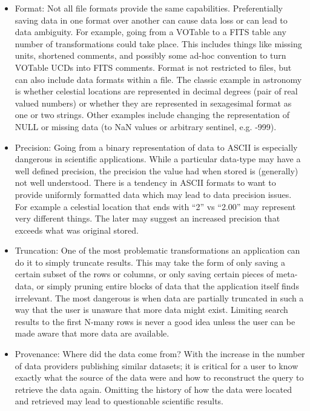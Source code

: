 \begin{itemize}

\item Format:  Not all file formats provide the same capabilities. Preferentially saving data in one format over another can cause data loss or can lead to data ambiguity.  For example, going from a VOTable to a FITS table any number of transformations could take place. This includes things like missing units, shortened comments, and possibly some ad-hoc convention to turn VOTable UCDs into FITS comments. Format is not restricted to files, but can also include data formats within a file.  The classic example in astronomy is whether celestial locations are represented in decimal degrees (pair of real valued numbers) or  whether they are represented in sexagesimal format as one or two strings. Other examples include changing the representation of NULL or missing data (to NaN values or arbitrary sentinel, e.g. -999).


\item Precision:  Going from a binary representation of data to ASCII is especially dangerous in scientific applications.   While a particular data-type may have a well defined precision, the precision the value had when stored is (generally) not well understood. There is a tendency in ASCII formats to want to provide uniformly formatted data which may lead to data precision issues.  For example a celestial location that ends with ``2'' vs ``2.00'' may represent very different things.  The later may suggest an increased precision that exceeds what was original stored.


\item Truncation:  One of the most problematic transformations an application can do it to simply truncate results.  This may take the form of only saving a certain subset of the rows or columns, or only saving certain pieces of meta-data, or simply pruning entire blocks of data that the application itself finds irrelevant.  The most dangerous is when data are partially truncated in such a way that the user is unaware that more data might exist.  Limiting search results to the first N-many rows is never a good idea unless the user can be made aware that more data are available.


\item Provenance: Where did the data come from? With the increase in the number of data providers publishing similar datasets; it is critical for a user to know exactly what the source of the data were and how to reconstruct the query to retrieve the data again.  Omitting the history of how the data were located and retrieved may lead to questionable scientific results.

\end{itemize}



